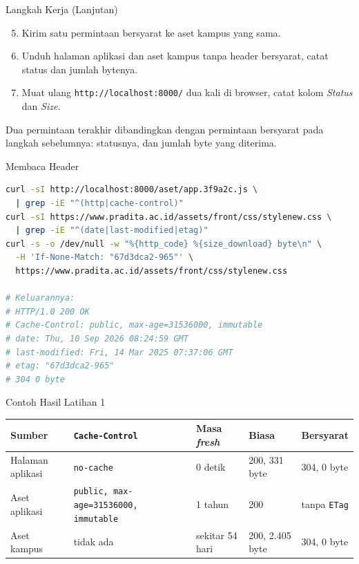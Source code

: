 \documentclass[aspectratio=169, table, 12pt]{beamer}
\begin{document}
\begin{frame}{{\Large Langkah Kerja (Lanjutan)}}
  \vspace{6pt}
  \begin{enumerate}
    \setcounter{enumi}{4}
    \item Kirim satu permintaan bersyarat ke aset kampus yang sama.
    \item Unduh halaman aplikasi dan aset kampus tanpa header bersyarat, catat
          status dan jumlah bytenya.
    \item Muat ulang \texttt{http://localhost:8000/} dua kali di browser, catat
          kolom \emph{Status} dan \emph{Size}.
  \end{enumerate}
  \vspace{6pt}
  {\footnotesize Dua permintaan terakhir dibandingkan dengan permintaan
  bersyarat pada langkah sebelumnya: statusnya, dan jumlah byte yang
  diterima.}
\end{frame}

\begin{frame}[fragile]{{\Large Membaca Header}}
  \vspace{2pt}
\begin{lstlisting}[language=bash]
curl -sI http://localhost:8000/aset/app.3f9a2c.js \
  | grep -iE "^(http|cache-control)"
curl -sI https://www.pradita.ac.id/assets/front/css/stylenew.css \
  | grep -iE "^(date|last-modified|etag)"
curl -s -o /dev/null -w "%{http_code} %{size_download} byte\n" \
  -H 'If-None-Match: "67d3dca2-965"' \
  https://www.pradita.ac.id/assets/front/css/stylenew.css

# Keluarannya:
# HTTP/1.0 200 OK
# Cache-Control: public, max-age=31536000, immutable
# date: Thu, 10 Sep 2026 08:24:59 GMT
# last-modified: Fri, 14 Mar 2025 07:37:06 GMT
# etag: "67d3dca2-965"
# 304 0 byte
\end{lstlisting}
\end{frame}

\begin{frame}{{\Large Contoh Hasil Latihan 1}}
  \vspace{6pt}
  \centering
  {\footnotesize
  \begin{tabularx}{\textwidth}{lYlll}
    \hline
    \textbf{Sumber} & \textbf{\texttt{Cache-Control}} & \textbf{Masa \textit{fresh}} & \textbf{Biasa} & \textbf{Bersyarat} \\
    \hline
    Halaman aplikasi & \texttt{no-cache} & 0 detik & 200, 331 byte & 304, 0 byte \\
    \hline
    Aset aplikasi & \texttt{public, max-age=31536000, immutable} & 1 tahun & 200 & tanpa \texttt{ETag} \\
    \hline
    Aset kampus & tidak ada & sekitar 54 hari & 200, 2.405 byte & 304, 0 byte \\
    \hline
  \end{tabularx}}
\end{frame}
\end{document}
